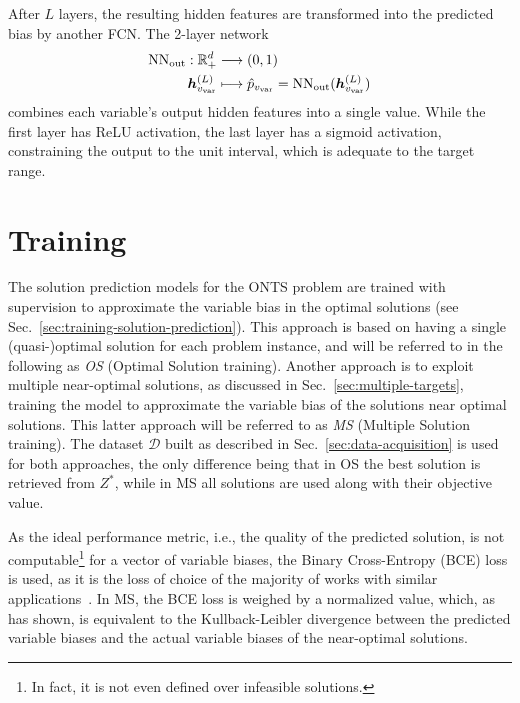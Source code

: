After $L$ layers, the resulting hidden features are transformed into the predicted bias by another FCN.
The 2-layer network
\begin{align*}
    {\rm NN}_{\rm out}:\mathbb{R}^d_+& \longrightarrow \left( 0,1 \right)  \\
    \bm{h}^{(L)}_{v_{\rm var}} &\longmapsto \hat{p}_{v_{\rm var}} = {\rm NN}_{\rm out}(\bm{h}^{(L)}_{v_{\rm var}})
\end{align*}
combines each variable's output hidden features into a single value.
While the first layer has ReLU activation, the last layer has a sigmoid activation, constraining the output to the unit interval, which is adequate to the target range.

\section{Training}

The solution prediction models for the ONTS problem are trained with supervision to approximate the variable bias in the optimal solutions (see
Sec.~\ref{sec:training-solution-prediction}).
This approach is based on having a single (quasi-)optimal solution for each problem instance, and will be referred to in the following as \emph{OS} (Optimal Solution training).
Another approach is to exploit multiple near-optimal solutions, as discussed in Sec.~\ref{sec:multiple-targets}, training the model to approximate the variable bias of the solutions near optimal solutions.
This latter approach will be referred to as \emph{MS} (Multiple Solution training).
The dataset $\mathcal{D}$ built as described in Sec.~\ref{sec:data-acquisition} is used for both approaches, the only difference being that in OS the best solution is retrieved from $Z^{*}$, while in MS all solutions are used along with their objective value. 

As the ideal performance metric, i.e., the quality of the predicted solution, is not computable\footnote{In fact, it is not even defined over infeasible solutions.} for a vector of variable biases, the Binary Cross-Entropy (BCE) loss is used, as it is the loss of choice of the majority of works with similar applications~\cite{nairSolvingMixedInteger2021,hanGNNGuidedPredictandSearchFramework2023,khalilMIPGNNDataDrivenFramework2022,gasseExactCombinatorialOptimization2019}.
In MS, the BCE loss is weighed by a normalized value, which, as  has shown, is equivalent to the Kullback-Leibler divergence between the predicted variable biases and the actual variable biases of the near-optimal solutions.

